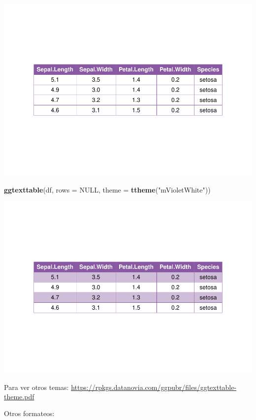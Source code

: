 \documentclass[
]{book}
\newenvironment{Shaded}{\begin{snugshade}}{\end{snugshade}}
\newcommand{\AttributeTok}[1]{\textcolor[rgb]{0.13,0.29,0.53}{#1}}
\newcommand{\ConstantTok}[1]{\textcolor[rgb]{0.56,0.35,0.01}{#1}}
\newcommand{\FunctionTok}[1]{\textcolor[rgb]{0.13,0.29,0.53}{\textbf{#1}}}
\newcommand{\NormalTok}[1]{#1}
\newcommand{\StringTok}[1]{\textcolor[rgb]{0.31,0.60,0.02}{#1}}
\begin{document}
\includegraphics{_main_files/figure-latex/unnamed-chunk-232-5.pdf}

\begin{Shaded}
\begin{Highlighting}[]
\FunctionTok{ggtexttable}\NormalTok{(df, }\AttributeTok{rows =} \ConstantTok{NULL}\NormalTok{, }\AttributeTok{theme =} \FunctionTok{ttheme}\NormalTok{(}\StringTok{"mVioletWhite"}\NormalTok{))}
\end{Highlighting}
\end{Shaded}

\includegraphics{_main_files/figure-latex/unnamed-chunk-232-6.pdf}

Para ver otros temas: \url{https://rpkgs.datanovia.com/ggpubr/files/ggtexttable-theme.pdf}

Otros formateos:
\end{document}
